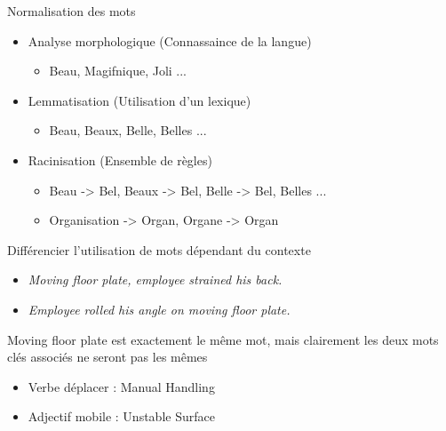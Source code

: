 \begin{frame}
	Normalisation des mots
	\begin{itemize}
		\item Analyse morphologique (Connassaince de la langue)
		\begin{itemize}
			\item Beau, Magifnique, Joli ...
		\end{itemize}	
		\item Lemmatisation (Utilisation d'un lexique)
		\begin{itemize}
			\item Beau, Beaux, Belle, Belles ...
		\end{itemize}	
		\item Racinisation (Ensemble de règles)
		\begin{itemize}
			\item Beau -> Bel, Beaux -> Bel, Belle -> Bel, Belles ...
			\item Organisation -> Organ, Organe -> Organ
		\end{itemize}	
		
	\end{itemize}
\end{frame}

\begin{frame}	
	Différencier l'utilisation de mots dépendant du contexte
	\begin{itemize}
		\item \textit{Moving floor plate, employee strained his back.}\\
		\item \textit{Employee rolled his angle on moving floor plate.}\\
	\end{itemize}
	Moving floor plate est exactement le même mot, mais clairement les deux mots clés associés ne seront pas les mêmes
	\begin{itemize}
		\item Verbe déplacer : Manual Handling\\
		\item Adjectif mobile : Unstable Surface\\
	\end{itemize}	
\end{frame}


